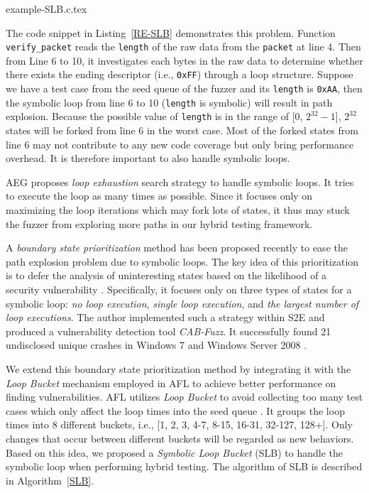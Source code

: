 \documentclass{cta-author}
\begin{document}

{example-SLB.c.tex} 

The code snippet in Listing~\ref{RE-SLB} demonstrates this problem. 
Function \texttt{verify\_packet} reads the \texttt{length} of the 
raw data from the \texttt{packet} at line 4.
Then from Line 6 to 10, it investigates each bytes in the raw data 
to determine whether there exists the ending descriptor 
(i.e., \texttt{0xFF}) through a loop structure. 
Suppose we have a test case from the seed queue of 
the fuzzer and its \texttt{length} is \texttt{0xAA}, 
then the symbolic loop 
from line 6 to 10 (\texttt{length} is symbolic) 
will result in path explosion.
Because the possible value of \texttt{length} is in the 
range of [0, $2^{32}-1$], $2^{32}$ states will be forked from 
line 6 in the worst case. 
Most of the forked states from line 6 may not contribute 
to any new code coverage but only bring performance overhead.
It is therefore important to also handle symbolic loops. 

AEG \cite{Avgerinos:2014:AEG:2556647.2560219} proposes \emph{loop exhaustion}
search strategy to handle symbolic loops. It tries to execute the loop as many
times as possible. Since it focuses only on maximizing the loop iterations which
may fork lots of states, it thus may stuck the fuzzer from exploring more paths 
in our hybrid testing framework.

A \textit{boundary state prioritization} method has been proposed recently
to ease the path explosion problem due to symbolic loops.
The key idea of this prioritization is to defer the analysis of 
uninteresting states based on the likelihood of a security vulnerability \cite{cab-fuzz}. 
Specifically, it focuses only on three types of states for a symbolic 
loop: \textit{no loop execution}, \textit{single loop execution}, and 
\textit{the largest number of loop executions}.
The author implemented such a strategy within S2E \cite{chipounov2011s2e} 
and produced a vulnerability detection tool \textit{CAB-Fuzz}.
It successfully found 21 undisclosed unique crashes in Windows 7 and 
Windows Server 2008 \cite{cab-fuzz}.

We extend this boundary state prioritization method by integrating it 
with the \emph{Loop Bucket} mechanism employed in AFL \cite{online:afl} 
to achieve better performance on finding vulnerabilities.
AFL utilizes \emph{Loop Bucket} to avoid collecting too many test cases 
which only affect the loop times into the seed queue \cite{online:afl}. 
It groups the loop times into 8 different buckets, i.e., 
[1, 2, 3, 4-7, 8-15, 16-31, 32-127, 128+]. Only changes that occur 
between different buckets will be regarded as new behaviors. 
Based on this idea, we proposed a \textit{Symbolic Loop Bucket} (SLB) 
to handle the symbolic loop when performing hybrid testing. The 
algorithm of SLB is described in Algorithm~\ref{SLB}.
\end{document}
